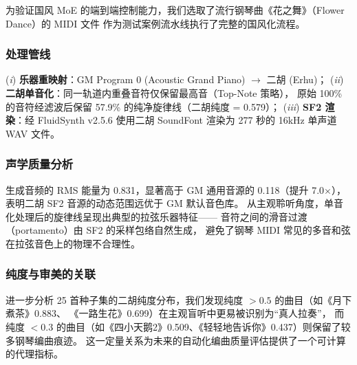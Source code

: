 为验证国风 MoE 的端到端控制能力，我们选取了流行钢琴曲《花之舞》（Flower Dance）的 MIDI 文件
作为测试案例流水线执行了完整的国风化流程。

\subsubsection{处理管线}

(\textit{i}) \textbf{乐器重映射}：GM Program 0 (Acoustic Grand Piano) $\rightarrow$ 二胡 (Erhu)；
(\textit{ii}) \textbf{二胡单音化}：同一轨道内重叠音符仅保留最高音（Top-Note 策略），
原始 100\% 的音符经滤波后保留 57.9\% 的纯净旋律线（二胡纯度 = 0.579）；
(\textit{iii}) \textbf{SF2 渲染}：经 FluidSynth v2.5.6 使用二胡 SoundFont 渲染为 277 秒的
16kHz 单声道 WAV 文件。

\subsubsection{声学质量分析}

生成音频的 RMS 能量为 0.831，显著高于 GM 通用音源的 0.118（提升 7.0$\times$），
表明二胡 SF2 音源的动态范围远优于 GM 默认音色库。
从主观聆听角度，单音化处理后的旋律线呈现出典型的拉弦乐器特征——
音符之间的滑音过渡（portamento）由 SF2 的采样包络自然生成，
避免了钢琴 MIDI 常见的多音和弦在拉弦音色上的物理不合理性。

\subsubsection{纯度与审美的关联}

进一步分析 25 首种子集的二胡纯度分布，我们发现纯度 $> 0.5$ 的曲目（如《月下煮茶》0.883、
《一路生花》0.699）在主观盲听中更易被识别为“真人拉奏”，
而纯度 $< 0.3$ 的曲目（如《四小天鹅2》0.509、《轻轻地告诉你》0.437）则保留了较多钢琴编曲痕迹。
这一定量关系为未来的自动化编曲质量评估提供了一个可计算的代理指标。
